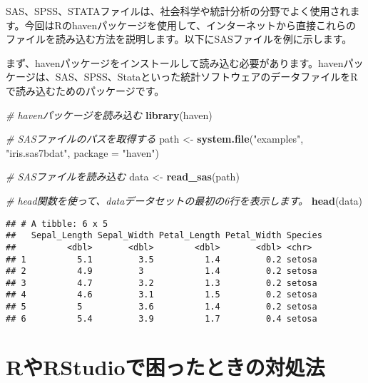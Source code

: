 \documentclass[
]{article}
\newenvironment{Shaded}{\begin{snugshade}}{\end{snugshade}}
\newcommand{\AttributeTok}[1]{\textcolor[rgb]{0.13,0.29,0.53}{#1}}
\newcommand{\CommentTok}[1]{\textcolor[rgb]{0.56,0.35,0.01}{\textit{#1}}}
\newcommand{\FunctionTok}[1]{\textcolor[rgb]{0.13,0.29,0.53}{\textbf{#1}}}
\newcommand{\NormalTok}[1]{#1}
\newcommand{\OtherTok}[1]{\textcolor[rgb]{0.56,0.35,0.01}{#1}}
\newcommand{\StringTok}[1]{\textcolor[rgb]{0.31,0.60,0.02}{#1}}
\begin{document}
SAS、SPSS、STATAファイルは、社会科学や統計分析の分野でよく使用されます。今回はRのhavenパッケージを使用して、インターネットから直接これらのファイルを読み込む方法を説明します。以下にSASファイルを例に示します。

まず、havenパッケージをインストールして読み込む必要があります。havenパッケージは、SAS、SPSS、Stataといった統計ソフトウェアのデータファイルをRで読み込むためのパッケージです。

\begin{Shaded}
\begin{Highlighting}[]
\CommentTok{\# havenパッケージを読み込む}
\FunctionTok{library}\NormalTok{(haven)}

\CommentTok{\# SASファイルのパスを取得する}
\NormalTok{path }\OtherTok{\textless{}{-}} \FunctionTok{system.file}\NormalTok{(}\StringTok{"examples"}\NormalTok{, }\StringTok{"iris.sas7bdat"}\NormalTok{, }\AttributeTok{package =} \StringTok{"haven"}\NormalTok{)}

\CommentTok{\# SASファイルを読み込む}
\NormalTok{data }\OtherTok{\textless{}{-}} \FunctionTok{read\_sas}\NormalTok{(path)}
\end{Highlighting}
\end{Shaded}

\begin{Shaded}
\begin{Highlighting}[]
\CommentTok{\# \textquotesingle{}head\textquotesingle{}関数を使って、\textquotesingle{}data\textquotesingle{}データセットの最初の6行を表示します。}
\FunctionTok{head}\NormalTok{(data)}
\end{Highlighting}
\end{Shaded}

\begin{verbatim}
## # A tibble: 6 x 5
##   Sepal_Length Sepal_Width Petal_Length Petal_Width Species
##          <dbl>       <dbl>        <dbl>       <dbl> <chr>  
## 1          5.1         3.5          1.4         0.2 setosa 
## 2          4.9         3            1.4         0.2 setosa 
## 3          4.7         3.2          1.3         0.2 setosa 
## 4          4.6         3.1          1.5         0.2 setosa 
## 5          5           3.6          1.4         0.2 setosa 
## 6          5.4         3.9          1.7         0.4 setosa
\end{verbatim}

\hypertarget{rux3084rstudioux3067ux56f0ux3063ux305fux3068ux304dux306eux5bfeux51e6ux6cd5}{%
\section{RやRStudioで困ったときの対処法}\label{rux3084rstudioux3067ux56f0ux3063ux305fux3068ux304dux306eux5bfeux51e6ux6cd5}}
\end{document}
